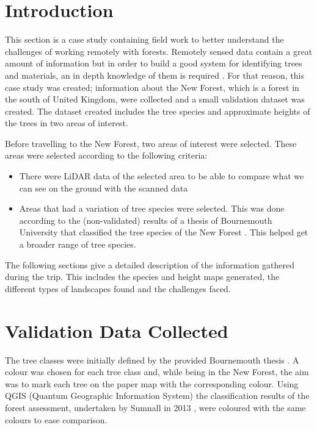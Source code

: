 \documentclass{subfiles}
\begin{document}
	\section{Introduction}
	\par This section is a case study containing field work to better understand the challenges of working remotely with forests. Remotely sensed data contain a great amount of information but in order to build a good system for identifying trees and materials, an in depth knowledge of them is required \cite{Smith2012}. For that reason, this case study was created; information about the New Forest, which is a forest in the south of United Kingdom, were collected and a small validation dataset was created. The dataset created includes the tree species and approximate heights of the trees in two areas of interest. 
	

	\par Before travelling to the New Forest, two areas of interest were selected. These areas were selected according to the following criteria:
	\begin{itemize}
		\item There were LiDAR data of the selected area to be able to compare what we can see on the ground with the scanned data
		\item Areas that had a variation of tree species were selected. This was done according to the (non-validated) results of a thesis of Bournemouth University that classified the tree species of the New Forest \cite{Sumnall2013}. This helped get a broader range of tree species. 
	\end{itemize}
	
	\par The following sections give a detailed description of the information gathered during the trip. This includes the species and height maps generated, the different types of landscapes found and the challenges faced. 
		
	
	   \section{Validation Data Collected}
	   \par The tree classes were initially defined by the provided Bournemouth thesis \cite{Sumnall2013}. A colour was chosen for each tree class and, while being in the New Forest, the aim was to mark each tree on the paper map with the corresponding colour. Using QGIS (Quantum Geographic Information System) the classification results of the forest assessment, undertaken by Sumnall in 2013 \cite{Sumnall2013}, were coloured with the same colours to ease comparison.
	   
\end{document}
